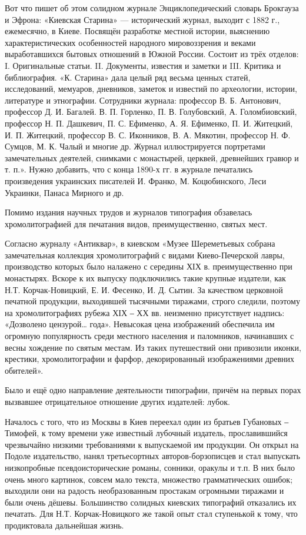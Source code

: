 Вот что пишет об этом солидном журнале Энциклопедический словарь Брокгауза и
Эфрона: «Киевская Старина» — исторический журнал, выходит с 1882 г.,
ежемесячно, в Киеве. Посвящён разработке местной истории, выяснению
характеристических особенностей народного мировоззрения и веками выработавшихся
бытовых отношений в Южной России. Состоит из трёх отделов: I. Оригинальные
статьи. II. Документы, известия и заметки и III. Критика и библиография. «К.
Старина» дала целый ряд весьма ценных статей, исследований, мемуаров,
дневников, заметок и известий по археологии, истории, литературе и этнографии.
Сотрудники журнала: профессор В. Б. Антонович, профессор Д. И. Багалей. В. П.
Горленко, П. В. Голубовский, А. Голомбиовский, профессор Н. П. Дашкевич, П. С.
Ефименко, А. Я. Ефименко, П. И. Житецкий, И. П. Житецкий, профессор В. С.
Иконников, В. А. Мякотин, профессор Н. Ф. Сумцов, М. К. Чалый и многие др.
Журнал иллюстрируется портретами замечательных деятелей, снимками с монастырей,
церквей, древнейших гравюр и т. п.». Нужно добавить, что с конца 1890-х гг. в
журнале печатались произведения украинских писателей И. Франко, М.
Коцюбинского, Леси Украинки, Панаса Мирного и др.

Помимо издания научных трудов и журналов типография обзавелась хромолитографией
для печатания видов, преимущественно, святых мест. 

Согласно журналу «Антиквар», в киевском «Музее Шереметьевых собрана
замечательная коллекция хромолитографий с видами Киево-Печерской лавры,
производство которых было налажено с середины ХІХ в. преимущественно при
монастырях. Вскоре к их выпуску подключились такие крупные издатели, как Н.Т.
Корчак-Новицкий, Е. И. Фесенко, И. Д. Сытин. За качеством церковной печатной
продукции, выходившей тысячными тиражами, строго следили, поэтому на
хромолитографиях рубежа ХІХ ‒ ХХ вв. неизменно присутствует надпись: «Дозволено
цензурой… года». Невысокая цена изображений обеспечила им огромную популярность
среди местного населения и паломников, начинавших с весны хождение по святым
местам. Из таких путешествий они привозили иконки, крестики, хромолитографии и
фарфор, декорированный изображениями древних обителей». 

Было и ещё одно направление деятельности типографии, причём на первых порах
вызвавшее отрицательное отношение других издателей: лубок. 

Началось с того, что из Москвы в Киев переехал один из братьев Губановых ‒
Тимофей, к тому времени уже известный лубочный издатель, прославившийся
чрезвычайно низкими требованиями к выпускаемой им продукции. Он открыл на
Подоле издательство, нанял третьесортных авторов-борзописцев и стал выпускать
низкопробные псевдоисторические романы, сонники, оракулы и т.п. В них было
очень много картинок, совсем мало текста, множество грамматических ошибок;
выходили они на радость необразованным простакам огромными тиражами и были
очень дёшевы. Большинство солидных киевских типографий отказались их печатать.
Для Н.Т. Корчак-Новицкого же такой опыт стал ступенькой к тому, что
продиктовала дальнейшая жизнь.

